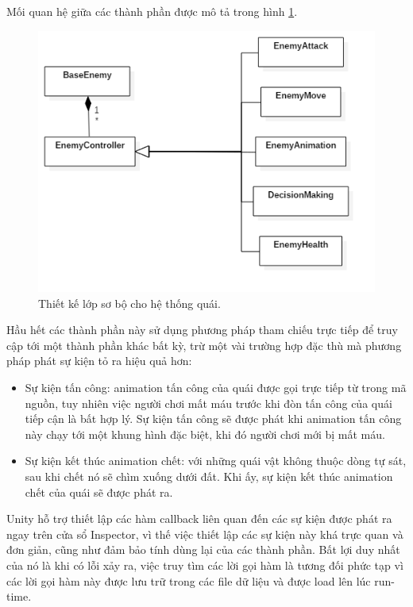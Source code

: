 \documentclass[12pt]{report}
\begin{document}
Mối quan hệ giữa các thành phần được mô tả trong hình \ref{fig:enemyclasses}.

\begin{figure}[H]
  \centering
    \includegraphics[width=13cm]{Pics/Chap4/Enemy.png}
  \caption{Thiết kế lớp sơ bộ cho hệ thống quái.}
  \label{fig:enemyclasses}
\end{figure}

Hầu hết các thành phần này sử dụng phương pháp tham chiếu trực tiếp để truy cập tới một thành phần khác bất kỳ, trừ một vài trường hợp đặc thù mà phương pháp phát sự kiện tỏ ra hiệu quả hơn:
\begin{itemize}
	\item Sự kiện tấn công: animation tấn công của quái được gọi trực tiếp từ trong mã nguồn, tuy nhiên việc người chơi mất máu trước khi đòn tấn công của quái tiếp cận là bất hợp lý. Sự kiện tấn công sẽ được phát khi animation tấn công này chạy tới một khung hình đặc biệt, khi đó người chơi mới bị mất máu.
	\item Sự kiện kết thúc animation chết: với những quái vật không thuộc dòng tự sát, sau khi chết nó sẽ chìm xuống dưới đất. Khi ấy, sự kiện kết thúc animation chết của quái sẽ được phát ra.
\end{itemize}

Unity hỗ trợ thiết lập các hàm callback liên quan đến các sự kiện được phát ra ngay trên cửa sổ Inspector, vì thế việc thiết lập các sự kiện này khá trực quan và đơn giản, cũng như đảm bảo tính dùng lại của các thành phần. Bất lợi duy nhất của nó là khi có lỗi xảy ra, việc truy tìm các lời gọi hàm là tương đối phức tạp vì các lời gọi hàm này được lưu trữ trong các file dữ liệu và được load lên lúc run-time.
\end{document}
